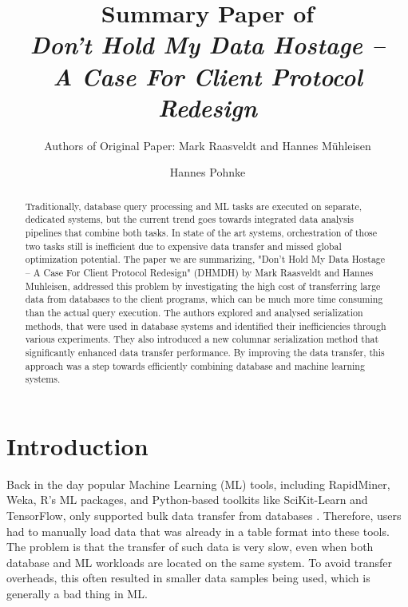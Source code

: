 \documentclass[sigconf]{acmart}
\begin{document}
\title{Summary Paper of \\ \textit{Don’t Hold My Data Hostage – \\A Case For Client Protocol Redesign}}
\subtitle{Authors of Original Paper: Mark Raasveldt and Hannes Mühleisen}


\author{Hannes Pohnke}


\begin{abstract}
Traditionally, database query processing and ML tasks are executed on separate, dedicated systems, but the current trend goes towards integrated data analysis pipelines that combine both tasks. In state of the art systems, orchestration of those two tasks still is inefficient due to expensive data transfer and missed global optimization potential. The paper we are summarizing, "Don’t Hold My Data Hostage – A Case For Client Protocol Redesign" (DHMDH) by Mark Raasveldt and Hannes Muhleisen, addressed this problem by investigating the high cost of transferring large data from databases to the client programs, which can be much more time consuming than the actual query execution. The authors explored and analysed serialization methods, that were used in database systems and identified their inefficiencies through various experiments. They also introduced a new columnar serialization method that significantly enhanced data transfer performance. By improving the data transfer, this approach was a step towards efficiently combining database and machine learning systems.
\end{abstract}


\maketitle

\section{Introduction}
Back in the day popular Machine Learning (ML) tools, including RapidMiner, Weka, R's ML packages, and Python-based toolkits like SciKit-Learn and TensorFlow, only supported bulk data transfer from databases \cite{viele papperpereper}. Therefore, users had to manually load data that was already in a table format into these tools. The problem is that the transfer of such data is very slow, even when both database and ML workloads are located on the same system. To avoid transfer overheads, this often resulted in smaller data samples being used, which is generally a bad thing in ML.
\end{document}
